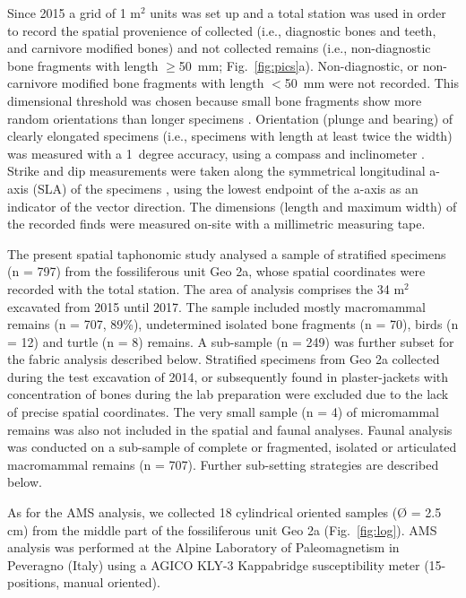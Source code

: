 \documentclass[5p,times,authoryear]{elsarticle}
\begin{document}
Since 2015 a grid of 1 m$^2$ units was set up and a total station was used in order to record the spatial provenience of collected (i.e., diagnostic bones and teeth, and carnivore modified bones) and not collected remains (i.e., non-diagnostic bone fragments with length $\geq$50~mm; Fig.~\ref{fig:pics}a). Non-diagnostic, or non-carnivore modified bone fragments with length $<$50~mm were not recorded. This dimensional threshold was chosen because small bone fragments show more random orientations than longer specimens \citep{Dominguez-Rodrigo2014}. Orientation (plunge and bearing) of clearly elongated specimens (i.e., specimens with length at least twice the width) was measured with a 1~degree accuracy, using a compass and inclinometer \citep[][among others]{Voorhies1969,Fiorillo1991,Eberth2007}. Strike and dip measurements were taken along the symmetrical longitudinal a-axis (SLA) of the specimens \citep{Dominguez-Rodrigo2013}, using the lowest endpoint of the a-axis as an indicator of the vector direction. The dimensions (length and maximum width) of the recorded finds were measured on-site with a millimetric measuring tape.

The present spatial taphonomic study analysed a sample of stratified specimens (n = 797) from the fossiliferous unit Geo 2a, whose spatial coordinates were recorded with the total station. The area of analysis comprises the 34 m$^2$ excavated from 2015 until 2017. The sample included mostly macromammal remains (n = 707, 89\%), undetermined isolated bone fragments (n = 70), birds (n = 12) and turtle (n = 8) remains. A sub-sample (n = 249) was further subset for the fabric analysis described below. Stratified specimens from Geo 2a collected during the test excavation of 2014, or subsequently found in plaster-jackets with concentration of bones during the lab preparation were excluded due to the lack of precise spatial coordinates. The very small sample (n = 4) of micromammal remains was also not included in the spatial and faunal analyses. Faunal analysis was conducted on a sub-sample of complete or fragmented, isolated or articulated macromammal remains (n = 707). Further sub-setting strategies are described below.

As for the AMS analysis, we collected 18 cylindrical oriented samples (Ø = 2.5 cm) from the middle part of the fossiliferous unit Geo 2a (Fig.~\ref{fig:log}). AMS analysis was performed at the Alpine Laboratory of Paleomagnetism in Peveragno (Italy) using a AGICO KLY-3 Kappabridge susceptibility meter (15-positions, manual oriented).
\end{document}
